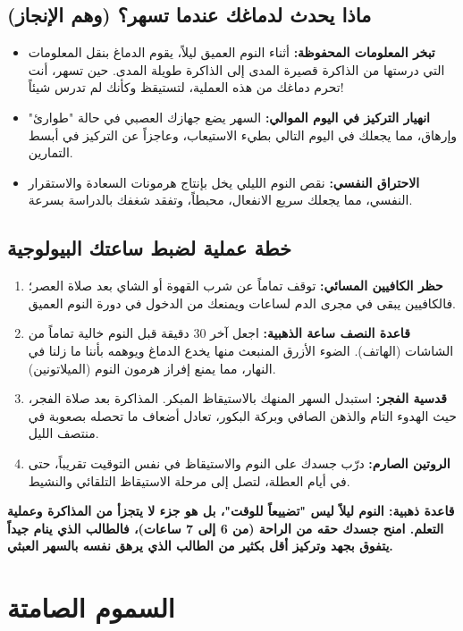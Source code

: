 \documentclass[12pt,a4paper]{book}
\newcommand{\importantAr}[1]{%
	\begin{important}
		\bfseries #1
	\end{important}
}
\begin{document}
	\subsection{ماذا يحدث لدماغك عندما تسهر؟ (وهم الإنجاز)}
	\begin{itemize}
		\item \textbf{تبخر المعلومات المحفوظة:} أثناء النوم العميق ليلاً، يقوم الدماغ بنقل المعلومات التي درستها من الذاكرة قصيرة المدى إلى الذاكرة طويلة المدى. حين تسهر، أنت تحرم دماغك من هذه العملية، لتستيقظ وكأنك لم تدرس شيئاً!
		\item \textbf{انهيار التركيز في اليوم الموالي:} السهر يضع جهازك العصبي في حالة "طوارئ" وإرهاق، مما يجعلك في اليوم التالي بطيء الاستيعاب، وعاجزاً عن التركيز في أبسط التمارين.
		\item \textbf{الاحتراق النفسي:} نقص النوم الليلي يخل بإنتاج هرمونات السعادة والاستقرار النفسي، مما يجعلك سريع الانفعال، محبطاً، وتفقد شغفك بالدراسة بسرعة.
	\end{itemize}
	
	\subsection{خطة عملية لضبط ساعتك البيولوجية}
	\begin{enumerate}
		\item \textbf{حظر الكافيين المسائي:} توقف تماماً عن شرب القهوة أو الشاي بعد صلاة العصر؛ فالكافيين يبقى في مجرى الدم لساعات ويمنعك من الدخول في دورة النوم العميق.
		\item \textbf{قاعدة النصف ساعة الذهبية:} اجعل آخر 30 دقيقة قبل النوم خالية تماماً من الشاشات (الهاتف). الضوء الأزرق المنبعث منها يخدع الدماغ ويوهمه بأننا ما زلنا في النهار، مما يمنع إفراز هرمون النوم (الميلاتونين).
		\item \textbf{قدسية الفجر:} استبدل السهر المنهك بالاستيقاظ المبكر. المذاكرة بعد صلاة الفجر، حيث الهدوء التام والذهن الصافي وبركة البكور، تعادل أضعاف ما تحصله بصعوبة في منتصف الليل.
		\item \textbf{الروتين الصارم:} درّب جسدك على النوم والاستيقاظ في نفس التوقيت تقريباً، حتى في أيام العطلة، لتصل إلى مرحلة الاستيقاظ التلقائي والنشيط.
	\end{enumerate}
	
	\importantAr{قاعدة ذهبية: النوم ليلاً ليس "تضييعاً للوقت"، بل هو جزء لا يتجزأ من المذاكرة وعملية التعلم. امنح جسدك حقه من الراحة (من 6 إلى 7 ساعات)، فالطالب الذي ينام جيداً يتفوق بجهد وتركيز أقل بكثير من الطالب الذي يرهق نفسه بالسهر العبثي.}
	\section{السموم الصامتة}
	
\end{document}
